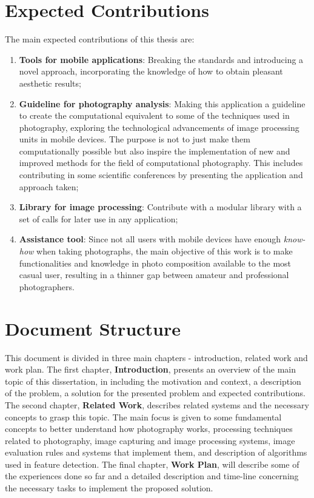 \section{Expected Contributions}

The main expected contributions of this thesis are:
\begin{enumerate}
	\item \textbf{Tools for mobile applications}: Breaking the standards and introducing a novel approach, incorporating the knowledge of how to obtain pleasant aesthetic results;

	\item \textbf{Guideline for photography analysis}: Making this application a guideline to create the computational equivalent to some of the techniques used in photography, exploring the technological advancements of image processing units in mobile devices. The purpose is not to just make them computationally possible but also inspire the implementation of new and improved methods for the field of computational photography. This includes contributing in some scientific conferences by presenting the application and approach taken;
	
	\item \textbf{Library for image processing}: Contribute with a modular library with a set of calls for later use in any application;
	
	\item \textbf{Assistance tool}: Since not all users with mobile devices have enough \emph{know-how} when taking photographs, the main objective of this work is to make functionalities and knowledge in photo composition available to the most casual user, resulting in a thinner gap between amateur and professional photographers.
\end{enumerate}

\section{Document Structure}

This document is divided in three main chapters - introduction, related work and work plan. The first chapter, \textbf{Introduction}, presents an overview of the main topic of this dissertation, in including the motivation and context, a description of the problem, a solution for the presented problem and expected contributions.
The second chapter, \textbf{Related Work}, describes related systems and the necessary concepts to grasp this topic. The main focus is given to some fundamental concepts to better understand how photography works, processing techniques related to photography, image capturing and image processing systems, image evaluation rules and systems that implement them, and description of algorithms used in feature detection. The final chapter, \textbf{Work Plan}, will describe some of the experiences done so far and a detailed description and time-line concerning the necessary tasks to implement the proposed solution.